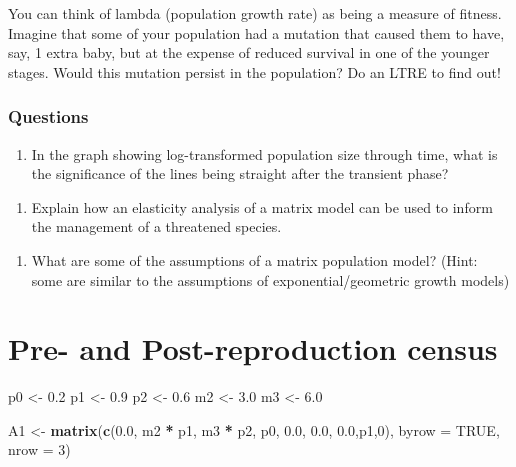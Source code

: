 \documentclass[
  a4paper]{book}
\newenvironment{Shaded}{\begin{snugshade}}{\end{snugshade}}
\newcommand{\AttributeTok}[1]{\textcolor[rgb]{0.13,0.29,0.53}{#1}}
\newcommand{\ConstantTok}[1]{\textcolor[rgb]{0.56,0.35,0.01}{#1}}
\newcommand{\DecValTok}[1]{\textcolor[rgb]{0.00,0.00,0.81}{#1}}
\newcommand{\FloatTok}[1]{\textcolor[rgb]{0.00,0.00,0.81}{#1}}
\newcommand{\FunctionTok}[1]{\textcolor[rgb]{0.13,0.29,0.53}{\textbf{#1}}}
\newcommand{\NormalTok}[1]{#1}
\newcommand{\OtherTok}[1]{\textcolor[rgb]{0.56,0.35,0.01}{#1}}
\newcommand{\SpecialCharTok}[1]{\textcolor[rgb]{0.81,0.36,0.00}{\textbf{#1}}}
\providecommand{\tightlist}{%
  \setlength{\itemsep}{0pt}\setlength{\parskip}{0pt}}
\begin{document}
You can think of lambda (population growth rate) as being a measure of fitness. Imagine that some of your population had a mutation that caused them to have, say, 1 extra baby, but at the expense of reduced survival in one of the younger stages. Would this mutation persist in the population? Do an LTRE to find out!

\subsection{Questions}\label{questions-8}

\begin{enumerate}
\def\labelenumi{\arabic{enumi}.}
\tightlist
\item
  In the graph showing log-transformed population size through time, what is the significance of the lines being straight after the transient phase?
\end{enumerate}

\begin{enumerate}
\def\labelenumi{\arabic{enumi}.}
\setcounter{enumi}{1}
\tightlist
\item
  Explain how an elasticity analysis of a matrix model can be used to inform the management of a threatened species.
\end{enumerate}

\begin{enumerate}
\def\labelenumi{\arabic{enumi}.}
\setcounter{enumi}{2}
\tightlist
\item
  What are some of the assumptions of a matrix population model? (Hint: some are similar to the assumptions of exponential/geometric growth models)
\end{enumerate}

\chapter{Pre- and Post-reproduction census}\label{pre--and-post-reproduction-census}

\begin{Shaded}
\begin{Highlighting}[]
\NormalTok{p0 }\OtherTok{\textless{}{-}} \FloatTok{0.2}
\NormalTok{p1 }\OtherTok{\textless{}{-}} \FloatTok{0.9}
\NormalTok{p2 }\OtherTok{\textless{}{-}} \FloatTok{0.6}
\NormalTok{m2 }\OtherTok{\textless{}{-}} \FloatTok{3.0}
\NormalTok{m3 }\OtherTok{\textless{}{-}} \FloatTok{6.0}

\NormalTok{A1 }\OtherTok{\textless{}{-}} \FunctionTok{matrix}\NormalTok{(}\FunctionTok{c}\NormalTok{(}\FloatTok{0.0}\NormalTok{, m2 }\SpecialCharTok{*}\NormalTok{ p1, m3 }\SpecialCharTok{*}\NormalTok{ p2,}
\NormalTok{               p0, }\FloatTok{0.0}\NormalTok{, }\FloatTok{0.0}\NormalTok{,}
               \FloatTok{0.0}\NormalTok{,p1,}\DecValTok{0}\NormalTok{), }\AttributeTok{byrow =} \ConstantTok{TRUE}\NormalTok{, }\AttributeTok{nrow =} \DecValTok{3}\NormalTok{)}
\end{Highlighting}
\end{Shaded}
\end{document}
